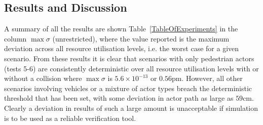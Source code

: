 \documentclass[letterpaper, 10 pt, journal, twoside]{IEEEtran}
\begin{document}









\subsection{Results and Discussion}\label{ResultsSection}
A summary of all the results are shown Table~\ref{TableOfExperiments} in the column $\max\sigma$ (unrestricted), where the value reported is the maximum deviation across all resource utilisation levels, i.e. the worst case for a given scenario.  
%
From these  results it is clear that scenarios with only pedestrian actors (tests 5-6) are consistently deterministic over all resource utilisation levels with or without a collision where $\max\sigma$ is $5.6\times10^{-13}$ or $0.56\si{\pico\metre}$. However, all other scenarios involving vehicles or a mixture of actor types breach the deterministic threshold that has been set, with some deviation in actor path as large as $59$cm. 
%
Clearly a deviation in results of such a large amount is unacceptable if simulation is to be used as a reliable verification tool.
\end{document}
